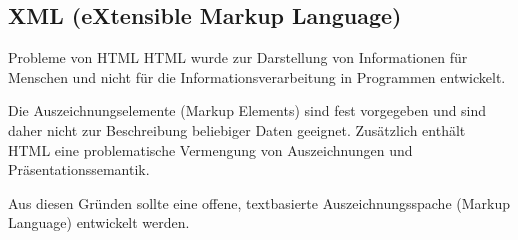 \subsection{XML (eXtensible Markup Language)}

\begin{bonus}{Probleme von HTML}
    HTML wurde zur Darstellung von Informationen für Menschen und nicht für die Informationsverarbeitung in Programmen entwickelt.

    Die Auszeichnungselemente (Markup Elements) sind fest vorgegeben und sind daher nicht zur Beschreibung beliebiger Daten geeignet.
    Zusätzlich enthält HTML eine problematische Vermengung von Auszeichnungen und Präsentationssemantik.

    Aus diesen Gründen sollte eine offene, textbasierte Auszeichnungsspache (Markup Language) entwickelt werden.
\end{bonus}

